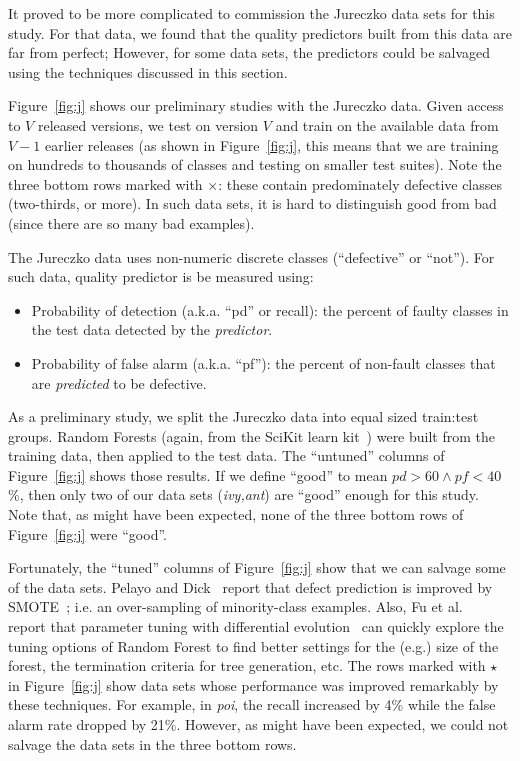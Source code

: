 \documentclass{sig-alternate}
\newcommand{\bi}{\begin{itemize}}
\newcommand{\ei}{\end{itemize}}
\newcommand{\fig}[1]{Figure~\ref{fig:#1}}
\begin{document}
 It proved to be  more complicated to commission the Jureczko data sets for this study.
 For that data, we found that the
 quality predictors built from this data are far from perfect;
However, for some data sets, the  predictors could
be salvaged using the techniques discussed in this section.

 \fig{j} shows our preliminary studies with the Jureczko   data.
Given access to $V$ released
versions, we test on version $V$ and train on the available data from $V-1$ earlier releases (as
shown in \fig{j}, this means that we are training on hundreds to thousands
of classes and testing on smaller test suites).
Note the   \colorbox{lavenderpink}{three bottom rows}   marked with $\times$: these contain predominately
defective classes (two-thirds, or more).  In such data sets, it is hard to distinguish
good from bad (since there are so many bad examples). 


The  Jureczko data uses non-numeric discrete classes (``defective'' or ``not'').
For such data, quality predictor   is be measured using:
\bi
\item Probability of detection (a.k.a. ``pd'' or recall):  the percent of faulty classes in
the test data detected
by the {\em predictor}.
\item Probability of false alarm (a.k.a. ``pf''): the percent of non-fault
classes that are {\em predicted} to be defective.
\ei 
As a preliminary study, we split the Jureczko  data   into equal sized train:test groups.
Random Forests (again, from the SciKit learn kit~\cite{Pedregosa2012}) were
built from the training data, then applied to the test data.
The ``untuned'' columns of \fig{j} shows those results.
If we define ``good'' to mean $\mathit{pd}>60 \wedge \mathit{pf} < 40$\%,
then only two of our data sets ({\em ivy,ant}) are ``good'' enough for this study.
Note that, as might have been expected, none of the \colorbox{lavenderpink}{three bottom rows} of \fig{j} were ``good''.

Fortunately,
the ``tuned'' columns of \fig{j} show that we can salvage some of the data sets. Pelayo and Dick~\cite{pelayo07} report that defect prediction is improved by SMOTE~\cite{Chawla2002}; i.e. an over-sampling of minority-class examples. Also, Fu et al.~\cite{fu:ase15} report that parameter tuning with differential evolution~\cite{storn97} can quickly explore the tuning options of Random Forest to find better settings for the (e.g.) size of the forest, the termination criteria
for tree generation, etc. The rows marked with $\star$ in \fig{j} show data sets whose performance was improved remarkably by these techniques. For example, in {\em poi}, the recall increased by 4\% while the false alarm rate dropped by 21\%. However,  as might have been expected, we could not salvage the data sets in the  three bottom rows.
\end{document}
